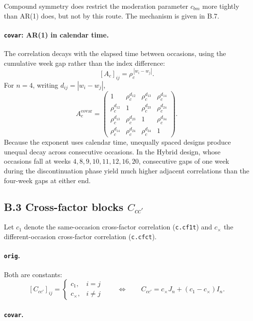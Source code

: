 \documentclass[
  11pt,
]{article}
\begin{document}
Compound symmetry does restrict the moderation parameter \(c_{bm}\)
more tightly than AR(1) does, but not by this route. The mechanism is
given in B.7.

\paragraph{\texttt{covar}: AR(1) in calendar time.}

The correlation decays with the elapsed time between occasions, using
the cumulative week gap rather than the index difference:
\[
[A_c]_{ij} = \rho_c^{\,|w_i - w_j|}.
\]
For \(n = 4\), writing \(d_{ij} = |w_i - w_j|\),
\[
A_c^{\text{covar}} =
\begin{pmatrix}
1 & \rho_c^{d_{12}} & \rho_c^{d_{13}} & \rho_c^{d_{14}}\\
\rho_c^{d_{12}} & 1 & \rho_c^{d_{23}} & \rho_c^{d_{24}}\\
\rho_c^{d_{13}} & \rho_c^{d_{23}} & 1 & \rho_c^{d_{34}}\\
\rho_c^{d_{14}} & \rho_c^{d_{24}} & \rho_c^{d_{34}} & 1
\end{pmatrix}.
\]
Because the exponent uses calendar time, unequally spaced designs
produce unequal decay across consecutive occasions. In the Hybrid
design, whose occasions fall at weeks
\(4, 8, 9, 10, 11, 12, 16, 20\), consecutive gaps of one week during
the discontinuation phase yield much higher adjacent correlations
than the four-week gaps at either end.

\subsection{B.3 Cross-factor blocks $C_{cc'}$}

Let \(c_1\) denote the same-occasion cross-factor correlation
(\texttt{c.cf1t}) and \(c_{\times}\) the different-occasion cross-factor
correlation (\texttt{c.cfct}).

\paragraph{\texttt{orig}.}

Both are constants:
\[
[C_{cc'}]_{ij} =
\begin{cases}
c_1, & i = j\\
c_{\times}, & i \neq j
\end{cases}
\qquad\Longleftrightarrow\qquad
C_{cc'} = c_{\times} J_n + (c_1 - c_{\times}) I_n .
\]

\paragraph{\texttt{covar}.}
\end{document}
